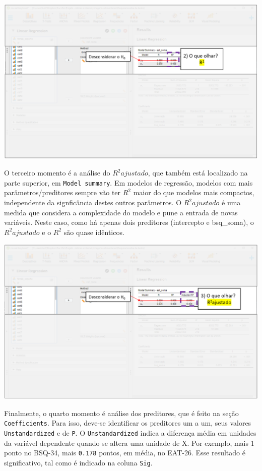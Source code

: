 \documentclass[
]{book}
\begin{document}
\includegraphics{./img/cap_reg_resultados2.png}

O terceiro momento é a análise do \(R^2 ajustado\), que também está
localizado na parte superior, em \texttt{Model\ summary}. Em modelos de
regressão, modelos com mais parâmetros/preditores sempre vão ter \(R^2\)
maior do que modelos mais compactos, independente da signficância destes
outros parâmetros. O \(R^2 ajustado\) é uma medida que considera a
complexidade do modelo e pune a entrada de novas variáveis. Neste caso,
como há apenas dois preditores (intercepto e bsq\_soma), o
\(R^2 ajustado\) e o \(R^2\) são quase idênticos.

\includegraphics{./img/cap_reg_resultados3.png}

Finalmente, o quarto momento é análise dos preditores, que é feito na
seção \texttt{Coefficients}. Para isso, deve-se identificar os
preditores um a um, seus valores \texttt{Unstandardized} e de
\texttt{P}. O \texttt{Unstandardized} indica a diferença média em
unidades da variável dependente quando se altera uma unidade de X. Por
exemplo, mais 1 ponto no BSQ-34, mais \texttt{0.178} pontos, em média,
no EAT-26. Esse resultado é significativo, tal como é indicado na coluna
\texttt{Sig}.
\end{document}
